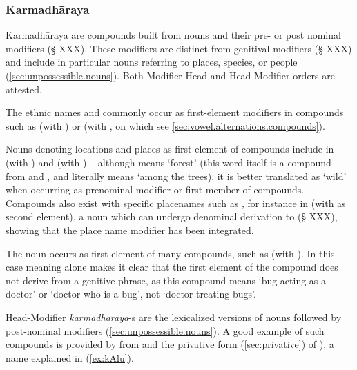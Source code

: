 \subsubsection{Karmadhāraya}  \label{sec:karmadharaya.n.n}

Karmadhāraya are compounds built from nouns and their pre- or post nominal modifiers (§ XXX). These modifiers are distinct from genitival modifiers (§ XXX) and include in particular nouns referring to places, species, or people (\ref{sec:unpossessible.nouns}).  Both Modifier-Head and Head-Modifier orders are attested.


The ethnic names  and  commonly occur as first-element modifiers in compounds such as  (with ) or (with , on which see \ref{sec:vowel.alternations.compounds}). 

Nouns denoting locations and places as first element of compounds include  in  (with ) and  (with ) -- although  means `forest' (this word itself is a compound from  and , and literally means `among the trees), it is better translated as `wild' when occurring as prenominal modifier or first member of compounds. Compounds also exist with specific placenames such as , for instance in  (with   as second element), a noun which can undergo denominal derivation to   (§ XXX), showing that the place name modifier has been integrated.

The noun  occurs as first element of many compounds, such as  (with ). In this case meaning alone makes it clear that the  first element of the compound does not derive from a genitive phrase, as this compound means `bug acting as a doctor' or `doctor who is a bug', not `doctor treating bugs'.

Head-Modifier \textit{karmadhāraya}-s are the lexicalized versions of nouns followed by post-nominal modifiers (\ref{sec:unpossessible.nouns}). A good example of such compounds is provided by  from  and the privative form  (\ref{sec:privative}) of ), a name explained in (\ref{ex:kAlu}). 

